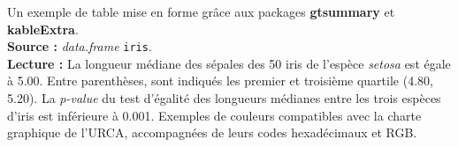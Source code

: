\documentclass[french,]{compterendu}
\theoremstyle{urcastyle}
\theoremstyle{remark}
\begin{document}
Un exemple de table mise en forme grâce aux packages \textbf{gtsummary} et \textbf{kableExtra}.\\
\textbf{Source :} \emph{data.frame} \texttt{iris}.\\
\textbf{Lecture :} La longueur médiane des sépales des 50 iris de l'espèce \emph{setosa} est égale à 5.00. Entre parenthèses, sont indiqués les premier et troisième quartile (4.80, 5.20). La \emph{p-value} du test d'égalité des longueurs médianes entre les trois espèces d'iris est inférieure à 0.001. Exemples de couleurs compatibles avec la charte graphique de l'URCA, accompagnées de leurs codes hexadécimaux et RGB.



\pagebreak
{}
\printbibliography[title={Bibliographie}, nottype=online, nottype=manual]
\printbibliography[title={Webographie}, type=online]
\printbibliography[title={Packages référencés}, type=manual]
\end{document}
